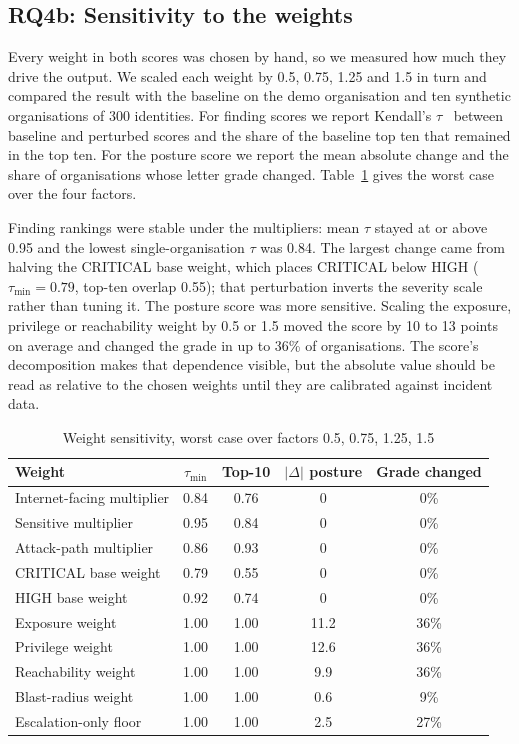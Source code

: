 \documentclass[conference]{IEEEtran}
\begin{document}
\subsection{RQ4b: Sensitivity to the weights}\label{sec:sensitivity}
Every weight in both scores was chosen by hand, so we measured how much they drive the output. We scaled each weight by 0.5, 0.75, 1.25 and 1.5 in turn and compared the result with the baseline on the demo organisation and ten synthetic organisations of 300 identities. For finding scores we report Kendall's $\tau$~\cite{kendall1938} between baseline and perturbed scores and the share of the baseline top ten that remained in the top ten. For the posture score we report the mean absolute change and the share of organisations whose letter grade changed. Table~\ref{tab:sens} gives the worst case over the four factors.

Finding rankings were stable under the multipliers: mean $\tau$ stayed at or above 0.95 and the lowest single-organisation $\tau$ was 0.84. The largest change came from halving the CRITICAL base weight, which places CRITICAL below HIGH ($\tau_{\min} = 0.79$, top-ten overlap 0.55); that perturbation inverts the severity scale rather than tuning it. The posture score was more sensitive. Scaling the exposure, privilege or reachability weight by 0.5 or 1.5 moved the score by 10 to 13 points on average and changed the grade in up to 36\% of organisations. The score's decomposition makes that dependence visible, but the absolute value should be read as relative to the chosen weights until they are calibrated against incident data.

\begin{table}[t]
\caption{Weight sensitivity, worst case over factors 0.5, 0.75, 1.25, 1.5}
\label{tab:sens}
\centering
\footnotesize
\setlength{\tabcolsep}{3pt}
\begin{tabular}{@{}lcccc@{}}
\toprule
Weight & $\tau_{\min}$ & Top-10 & $|\Delta|$ posture & Grade changed \\
\midrule
Internet-facing multiplier & 0.84 & 0.76 & 0 & 0\% \\
Sensitive multiplier & 0.95 & 0.84 & 0 & 0\% \\
Attack-path multiplier & 0.86 & 0.93 & 0 & 0\% \\
CRITICAL base weight & 0.79 & 0.55 & 0 & 0\% \\
HIGH base weight & 0.92 & 0.74 & 0 & 0\% \\
Exposure weight & 1.00 & 1.00 & 11.2 & 36\% \\
Privilege weight & 1.00 & 1.00 & 12.6 & 36\% \\
Reachability weight & 1.00 & 1.00 & 9.9 & 36\% \\
Blast-radius weight & 1.00 & 1.00 & 0.6 & 9\% \\
Escalation-only floor & 1.00 & 1.00 & 2.5 & 27\% \\
\bottomrule
\end{tabular}
\end{table}
\end{document}
